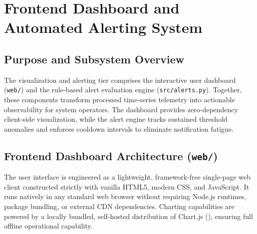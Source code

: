 \section{Frontend Dashboard and Automated Alerting System}
\label{sec:frontend_alerts}

\subsection{Purpose and Subsystem Overview}
The visualization and alerting tier comprises the interactive user dashboard (\texttt{web/}) and the rule-based alert evaluation engine (\texttt{src/alerts.py}). Together, these components transform processed time-series telemetry into actionable observability for system operators. The dashboard provides zero-dependency client-side visualization, while the alert engine tracks sustained threshold anomalies and enforces cooldown intervals to eliminate notification fatigue.

\subsection{Frontend Dashboard Architecture (\texttt{web/})}
The user interface is engineered as a lightweight, framework-free single-page web client constructed strictly with vanilla HTML5, modern CSS, and JavaScript. It runs natively in any standard web browser without requiring Node.js runtimes, package bundling, or external CDN dependencies. Charting capabilities are powered by a locally bundled, self-hosted distribution of Chart.js (), ensuring full offline operational capability.

